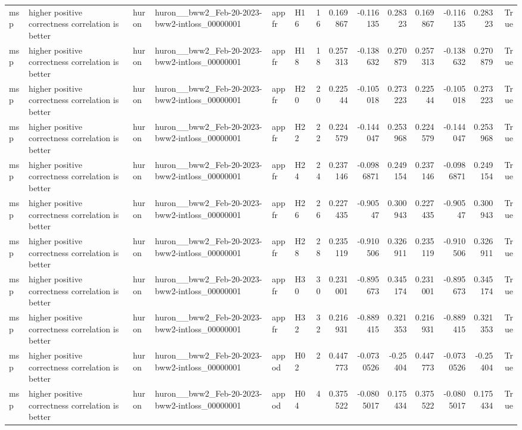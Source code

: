 \begin{longtable}{llllllrrrrrrrr}
msp & higher positive correctness correlation is better & huron & huron\_\_bww2\_Feb-20-2023-bww2-intloss\_00000001 & appfr & H16 & 16 & 0.169867 & -0.116135 & 0.28323 & 0.169867 & -0.116135 & 0.28323 & True \\
msp & higher positive correctness correlation is better & huron & huron\_\_bww2\_Feb-20-2023-bww2-intloss\_00000001 & appfr & H18 & 18 & 0.257313 & -0.138632 & 0.270879 & 0.257313 & -0.138632 & 0.270879 & True \\
msp & higher positive correctness correlation is better & huron & huron\_\_bww2\_Feb-20-2023-bww2-intloss\_00000001 & appfr & H20 & 20 & 0.22544 & -0.105018 & 0.273223 & 0.22544 & -0.105018 & 0.273223 & True \\
msp & higher positive correctness correlation is better & huron & huron\_\_bww2\_Feb-20-2023-bww2-intloss\_00000001 & appfr & H22 & 22 & 0.224579 & -0.144047 & 0.253968 & 0.224579 & -0.144047 & 0.253968 & True \\
msp & higher positive correctness correlation is better & huron & huron\_\_bww2\_Feb-20-2023-bww2-intloss\_00000001 & appfr & H24 & 24 & 0.237146 & -0.0986871 & 0.249154 & 0.237146 & -0.0986871 & 0.249154 & True \\
msp & higher positive correctness correlation is better & huron & huron\_\_bww2\_Feb-20-2023-bww2-intloss\_00000001 & appfr & H26 & 26 & 0.227435 & -0.90547 & 0.300943 & 0.227435 & -0.90547 & 0.300943 & True \\
msp & higher positive correctness correlation is better & huron & huron\_\_bww2\_Feb-20-2023-bww2-intloss\_00000001 & appfr & H28 & 28 & 0.235119 & -0.910506 & 0.326911 & 0.235119 & -0.910506 & 0.326911 & True \\
msp & higher positive correctness correlation is better & huron & huron\_\_bww2\_Feb-20-2023-bww2-intloss\_00000001 & appfr & H30 & 30 & 0.231001 & -0.895673 & 0.345174 & 0.231001 & -0.895673 & 0.345174 & True \\
msp & higher positive correctness correlation is better & huron & huron\_\_bww2\_Feb-20-2023-bww2-intloss\_00000001 & appfr & H32 & 32 & 0.216931 & -0.889415 & 0.321353 & 0.216931 & -0.889415 & 0.321353 & True \\
msp & higher positive correctness correlation is better & huron & huron\_\_bww2\_Feb-20-2023-bww2-intloss\_00000001 & appod & H02 & 2 & 0.447773 & -0.0730526 & -0.25404 & 0.447773 & -0.0730526 & -0.25404 & True \\
msp & higher positive correctness correlation is better & huron & huron\_\_bww2\_Feb-20-2023-bww2-intloss\_00000001 & appod & H04 & 4 & 0.375522 & -0.0805017 & 0.175434 & 0.375522 & -0.0805017 & 0.175434 & True \\

\end{longtable}
